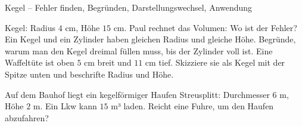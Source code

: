 \begin{aufgabe}{Kegel – Fehler finden, Begründen, Darstellungswechsel, Anwendung}
\begin{teile}
\teil Kegel: Radius $4$ cm, Höhe $15$ cm. Paul rechnet das Volumen:  Wo ist der Fehler?
\teil Ein Kegel und ein Zylinder haben gleichen Radius und gleiche Höhe. Begründe, warum man den Kegel dreimal füllen muss, bis der Zylinder voll ist.
\teil Eine Waffeltüte ist oben $5$ cm breit und $11$ cm tief. Skizziere sie als Kegel mit der Spitze unten und beschrifte Radius und Höhe.

\teil Auf dem Bauhof liegt ein kegelförmiger Haufen Streusplitt: Durchmesser $6$ m, Höhe $2$ m. Ein Lkw kann $15$ m³ laden. Reicht eine Fuhre, um den Haufen abzufahren?
\end{teile}
\end{aufgabe}
